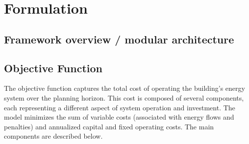 \documentclass[11pt]{article}
\begin{document}
\section{Formulation}
\label{sec:formulation}

\subsection{Framework overview / modular architecture}
\label{sec:framework}

\subsection{Objective Function}
\label{sec:obj}

The objective function captures the total cost of operating the building’s energy system over the planning horizon. This cost is composed of several components, each representing a different aspect of system operation and investment. The model minimizes the sum of variable costs (associated with energy flows and penalties) and annualized capital and fixed operating costs. The main components are described below.
\end{document}
